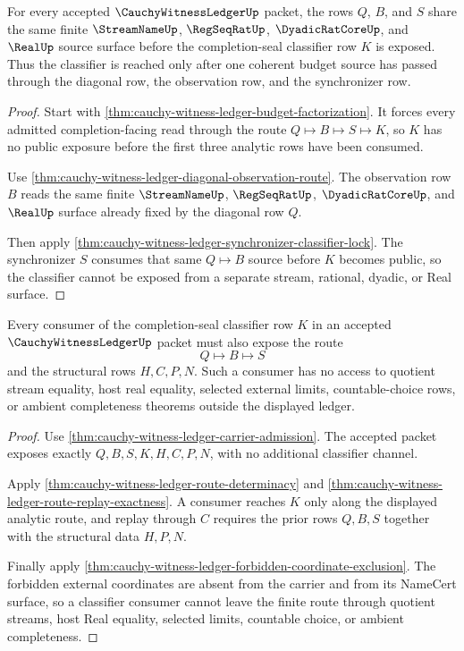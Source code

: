 \begin{theorem}
\label{thm:cauchy-witness-ledger-budget-source-coherence}
For every accepted $\CauchyWitnessLedgerUp$ packet, the rows $Q$, $B$, and $S$ share the same finite $\StreamNameUp$, $\RegSeqRatUp$, $\DyadicRatCoreUp$, and $\RealUp$ source surface before the completion-seal classifier row $K$ is exposed. Thus the classifier is reached only after one coherent budget source has passed through the diagonal row, the observation row, and the synchronizer row.
\end{theorem}
\begin{proof}
Start with \autoref{thm:cauchy-witness-ledger-budget-factorization}. It forces every admitted completion-facing read through the route $Q \longmapsto B \longmapsto S \longmapsto K$, so $K$ has no public exposure before the first three analytic rows have been consumed.

Use \autoref{thm:cauchy-witness-ledger-diagonal-observation-route}. The observation row $B$ reads the same finite $\StreamNameUp$, $\RegSeqRatUp$, $\DyadicRatCoreUp$, and $\RealUp$ surface already fixed by the diagonal row $Q$.

Then apply \autoref{thm:cauchy-witness-ledger-synchronizer-classifier-lock}. The synchronizer $S$ consumes that same $Q \longmapsto B$ source before $K$ becomes public, so the classifier cannot be exposed from a separate stream, rational, dyadic, or Real surface.
\end{proof}

\begin{theorem}
\label{thm:cauchy-witness-ledger-classifier-consumer-nonescape}
Every consumer of the completion-seal classifier row $K$ in an accepted $\CauchyWitnessLedgerUp$ packet must also expose the route
$$
Q \longmapsto B \longmapsto S
$$
and the structural rows $H,C,P,N$. Such a consumer has no access to quotient stream equality, host real equality, selected external limits, countable-choice rows, or ambient completeness theorems outside the displayed ledger.
\end{theorem}
\begin{proof}
Use \autoref{thm:cauchy-witness-ledger-carrier-admission}. The accepted packet exposes exactly $Q,B,S,K,H,C,P,N$, with no additional classifier channel.

Apply \autoref{thm:cauchy-witness-ledger-route-determinacy} and \autoref{thm:cauchy-witness-ledger-route-replay-exactness}. A consumer reaches $K$ only along the displayed analytic route, and replay through $C$ requires the prior rows $Q,B,S$ together with the structural data $H,P,N$.

Finally apply \autoref{thm:cauchy-witness-ledger-forbidden-coordinate-exclusion}. The forbidden external coordinates are absent from the carrier and from its NameCert surface, so a classifier consumer cannot leave the finite route through quotient streams, host Real equality, selected limits, countable choice, or ambient completeness.
\end{proof}

